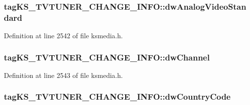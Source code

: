 \subsubsection[{\texorpdfstring{dw\+Analog\+Video\+Standard}{dwAnalogVideoStandard}}]{ tag\+K\+S\+\_\+\+T\+V\+T\+U\+N\+E\+R\+\_\+\+C\+H\+A\+N\+G\+E\+\_\+\+I\+N\+F\+O\+::dw\+Analog\+Video\+Standard}\hypertarget{structtag_k_s___t_v_t_u_n_e_r___c_h_a_n_g_e___i_n_f_o_abb514f964e558a85d1052e0fa32437ee}{}\label{structtag_k_s___t_v_t_u_n_e_r___c_h_a_n_g_e___i_n_f_o_abb514f964e558a85d1052e0fa32437ee}


Definition at line 2542 of file ksmedia.\+h.

\subsubsection[{\texorpdfstring{dw\+Channel}{dwChannel}}]{ tag\+K\+S\+\_\+\+T\+V\+T\+U\+N\+E\+R\+\_\+\+C\+H\+A\+N\+G\+E\+\_\+\+I\+N\+F\+O\+::dw\+Channel}\hypertarget{structtag_k_s___t_v_t_u_n_e_r___c_h_a_n_g_e___i_n_f_o_af9bd59103584bea062bba41d19709817}{}\label{structtag_k_s___t_v_t_u_n_e_r___c_h_a_n_g_e___i_n_f_o_af9bd59103584bea062bba41d19709817}


Definition at line 2543 of file ksmedia.\+h.

\subsubsection[{\texorpdfstring{dw\+Country\+Code}{dwCountryCode}}]{ tag\+K\+S\+\_\+\+T\+V\+T\+U\+N\+E\+R\+\_\+\+C\+H\+A\+N\+G\+E\+\_\+\+I\+N\+F\+O\+::dw\+Country\+Code}\hypertarget{structtag_k_s___t_v_t_u_n_e_r___c_h_a_n_g_e___i_n_f_o_a3658f9c947c17aa87da9e4869a5f2b8e}{}\label{structtag_k_s___t_v_t_u_n_e_r___c_h_a_n_g_e___i_n_f_o_a3658f9c947c17aa87da9e4869a5f2b8e}


